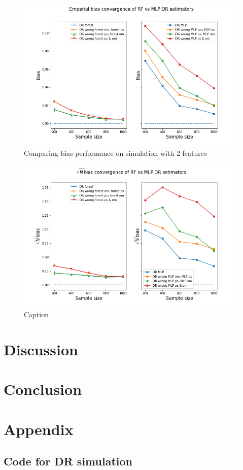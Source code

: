 \documentclass[12pt,twoside]{article}
\begin{document}
\begin{figure}[h!]
    \centering
    \includegraphics[width = 0.8\columnwidth]{figures/biascompare.png}
    \caption{Comparing bias performance on simulation with 2 features}
    \label{fig:my_label}
\end{figure}

\begin{figure}[h!]
    \centering
    \includegraphics[width = 0.8\columnwidth]{figures/sqrtncompare.png}
    \caption{Caption}
    \label{fig:my_label}
\end{figure}
\clearpage
\section{Discussion}

\section{Conclusion}

\clearpage
\section{Appendix}

\subsection*{Code for DR simulation}



\clearpage


\end{document}
